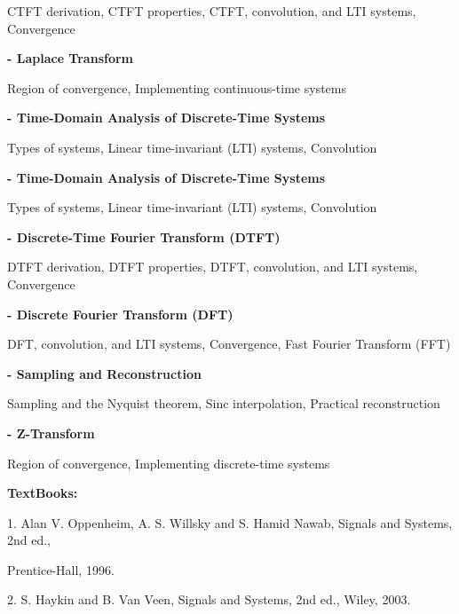 \documentclass[12pt,a4paper]{article}
\begin{document}
CTFT derivation, CTFT properties, CTFT, convolution, and LTI systems, Convergence\par
\vspace{2pt}\textbf{- Laplace Transform}\par
Region of convergence, Implementing continuous-time systems\par
\vspace{2pt}\textbf{- Time-Domain Analysis of Discrete-Time Systems}\par
Types of systems, Linear time-invariant (LTI) systems, Convolution\par
\vspace{2pt}\textbf{- Time-Domain Analysis of Discrete-Time Systems}\par
Types of systems, Linear time-invariant (LTI) systems, Convolution\par
\vspace{2pt}\textbf{- Discrete-Time Fourier Transform (DTFT)}\par
DTFT derivation, DTFT properties, DTFT, convolution, and LTI systems, Convergence\par
\vspace{2pt}\textbf{- Discrete Fourier Transform (DFT)}\par
DFT, convolution, and LTI systems, Convergence, Fast Fourier Transform (FFT)\par
\vspace{2pt}\textbf{- Sampling and Reconstruction}\par
Sampling and the Nyquist theorem, Sinc interpolation, Practical reconstruction\par
\vspace{2pt}\textbf{- Z-Transform}\par
Region of convergence, Implementing discrete-time systems\par\vspace{4pt}
\textbf{TextBooks:}\par\vspace{2pt}
1. Alan V. Oppenheim, A. S. Willsky and S. Hamid Nawab, Signals and Systems, 2nd ed.,\par
Prentice-Hall, 1996.\par
2. S. Haykin and B. Van Veen, Signals and Systems, 2nd ed., Wiley, 2003.\par
\vspace{4pt}
\end{document}
